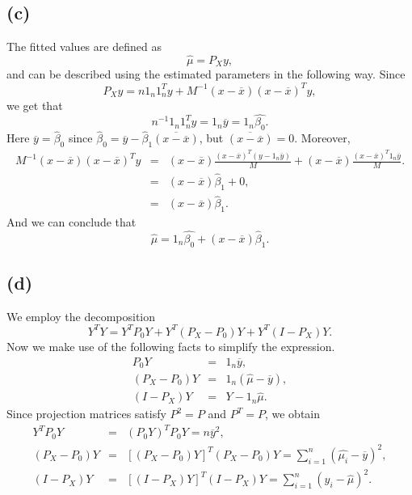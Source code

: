 \subsection*{(c)}
The fitted values are defined as
\[
\hat{\mu}=P_{X}y,
\]
and can be described using the estimated parameters in the following
way. Since 
\[
P_{X}y=n1_{n}1_{n}^{T}y+M^{-1}(x-\overline{x})(x-\overline{x})^{T}y,
\]
we get that
\[
n^{-1}1_{n}1_{n}^{T}y=1_{n}\overline{y}=1_{n}\hat{\beta_{0}}.
\]
Here $\overline{y}=\hat{\beta}_{0}$ since $\hat{\beta}_{0}=\overline{y}-\hat{\beta}_{1}\overline{(x-\overline{x})}$,
but $\overline{(x-\overline{x})}=0$. 
Moreover,
\begin{eqnarray*}
M^{-1}(x-\overline{x})(x-\overline{x})^{T}y & = & (x-\overline{x})\frac{(x-\overline{x})^{T}(y-1_{n}\overline{y})}{M}+(x-\overline{x})\frac{(x-\overline{x})^{T}1_{n}\overline{y}}{M}.\\
 & = & (x-\overline{x})\hat{\beta}_{1}+0,\\
 & = & (x-\overline{x})\hat{\beta}_{1}.
\end{eqnarray*}
And we can conclude that
\[
\hat{\mu}=1_{n}\hat{\beta_{0}}+(x-\overline{x})\hat{\beta}_{1}.
\]

\subsection*{(d)}
We employ the decomposition
\[
Y^{T}Y=Y^{T}P_{0}Y+Y^{T}(P_{X}-P_{0})Y+Y^{T}(I-P_{X})Y.
\]
Now we make use of the following facts to simplify the expression.
\begin{eqnarray*}
P_{0}Y & = & 1_{n}\overline{y},\\
(P_{X}-P_{0})Y & = & 1_{n}(\hat{\mu}-\overline{y}),\\
(I-P_{X})Y & = & Y-1_{n}\hat{\mu}.
\end{eqnarray*}
Since projection matrices satisfy $P^{2}=P$ and $P^{T}=P$, we obtain
\begin{eqnarray*}
Y^{T}P_{0}Y & = & (P_{0}Y)^{T}P_{0}Y=n\overline{y}^{2},\\
(P_{X}-P_{0})Y & = & [(P_{X}-P_{0})Y]^{T}(P_{X}-P_{0})Y=\sum_{i=1}^{n}(\hat{\mu_{i}}-\overline{y})^{2},\\
(I-P_{X})Y & = & [(I-P_{X})Y]^{T}(I-P_{X})Y=\sum_{i=1}^{n}(y_{i}-\hat{\mu})^{2}.
\end{eqnarray*}


